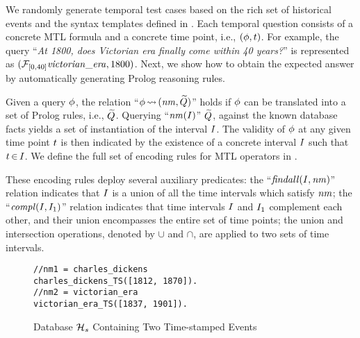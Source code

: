 We randomly generate temporal test cases based on the rich set of historical events and the syntax templates defined in . 
Each temporal question consists of a concrete MTL formula and a concrete time point, i.e., $(\phi, t)$. 
For example, the query ``\emph{At 1800, does Victorian era finally come within 40 years?}'' is represented as $(\mathcal{F}_{[0, 40]} \mathit{victorian\_era}, 1800)$. 
Next, we show how to obtain the expected answer by automatically generating Prolog reasoning rules. 

Given a query $\phi$, the relation ``$\phi{\,\mathrel{\leadsto}\,}(\mathit{nm}, \widetilde{Q})$'' holds if $\phi$ can be translated into a set of Prolog rules, i.e., $\widetilde{Q}$. 
Querying ``$\mathit{nm}(I)$'' 
$\widetilde{Q}$, against the known database facts yields a set of instantiation of the interval $I$. 
The validity of $\phi$ at any given time point $t$ is then indicated by the existence of a concrete interval  $I$ such that $t\,{\in}\,I$. 
We define the full set of encoding rules for MTL operators in . 

These encoding rules deploy several auxiliary predicates: the 
``$\mathit{findall}(I, \mathit{nm})$'' relation indicates that $I$ is a union of all the time intervals which satisfy $\mathit{nm}$; 
the  ``$\mathit{compl}(I, I_1)$'' relation indicates that time intervals $I$ and $I_1$ complement each other, and their union encompasses the entire set of time points; the union and intersection operations, denoted by $\cup$ and $\cap$, are applied to two sets of time intervals. 

\begin{figure}[!h]
\vspace{-2mm}
\vspace{0mm}
\begin{lstlisting}[xleftmargin=6em,numbersep=5pt,basicstyle=\footnotesize\ttfamily]
//nm1 = charles_dickens
charles_dickens_TS([1812, 1870]).
//nm2 = victorian_era
victorian_era_TS([1837, 1901]).
\end{lstlisting} 
\vspace{-1mm}
\caption{Database $\mathcal{H}_s$ Containing Two Time-stamped Events}
\label{fig:Prolog_encoding_Example}
\vspace{-2mm}
\end{figure}


